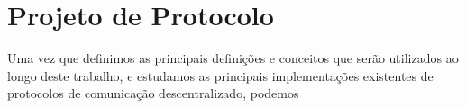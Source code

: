 
\chapter{Projeto de Protocolo}

Uma vez que definimos as principais definições e conceitos que serão utilizados ao longo deste trabalho, e estudamos as principais implementações existentes de protocolos de comunicação descentralizado, podemos 